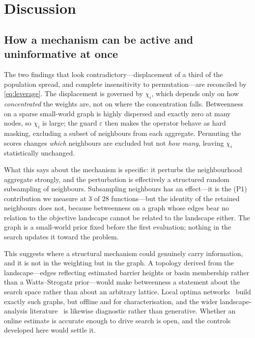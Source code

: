 \section{Discussion}
\label{sec:discussion}

\subsection{How a mechanism can be active and uninformative at once}

The two findings that look contradictory---displacement of a third of the
population spread, and complete insensitivity to permutation---are reconciled
by \eqref{eq:leverage}. The displacement is governed by $\chi_i$, which depends
only on how \emph{concentrated} the weights are, not on where the concentration
falls. Betweenness on a sparse small-world graph is highly dispersed and
exactly zero at many nodes, so $\chi_i$ is large; the guard $\varepsilon$ then
makes the operator behave as hard masking, excluding a subset of neighbours
from each aggregate. Permuting the scores changes \emph{which} neighbours are
excluded but not \emph{how many}, leaving $\chi_i$ statistically unchanged.

What this says about the mechanism is specific: it perturbs the neighbourhood
aggregate strongly, and the perturbation is effectively a structured random
subsampling of neighbours. Subsampling neighbours has an effect---it is the
(P1) contribution we measure at $3$ of $28$ functions---but the identity of the
retained neighbours does not, because betweenness on a graph whose edges bear
no relation to the objective landscape cannot be related to the landscape
either. The graph is a small-world prior fixed before the first evaluation;
nothing in the search updates it toward the problem.

This suggests where a structural mechanism could genuinely carry information,
and it is not in the weighting but in the graph. A topology derived from the
landscape---edges reflecting estimated barrier heights or basin membership
rather than a Watts--Strogatz prior---would make betweenness a statement about
the search space rather than about an arbitrary lattice. Local optima
networks~\cite{ochoa2008lon} build exactly such graphs, but offline and for
characterisation, and the wider landscape-analysis
literature~\cite{malan2021survey} is likewise diagnostic rather than
generative. Whether an online estimate is accurate enough to drive search is
open, and the controls developed here would settle it.

